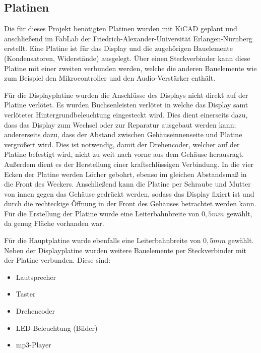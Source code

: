\documentclass[journal, a4paper]{IEEEtran}
\begin{document}
	\subsection{Platinen}
		\label{sc:Hardware:subsc:Platinen}
		Die für dieses Projekt benötigten Platinen wurden mit KiCAD geplant und anschließend im FabLab der Friedrich-Alexander-Universität Erlangen-Nürnberg erstellt. Eine Platine ist für das Display und die zugehörigen Bauelemente (Kondensatoren, Widerstände) ausgelegt. Über einen Steckverbinder kann diese Platine mit einer zweiten verbunden werden, welche die anderen Bauelemente wie zum Beispiel den Mikrocontroller und den Audio-Verstärker enthält. \par
		Für die Displayplatine wurden die Anschlüsse des Displays nicht direkt auf der Platine verlötet. Es wurden Buchsenleisten verlötet in welche das Display samt verlöteter Hintergrundbeleuchtung eingesteckt wird. Dies dient einerseits dazu, dass das Display zum Wechsel oder zur Reparatur ausgebaut werden kann; andererseits dazu, dass der Abstand zwischen Gehäuseinnenseite und Platine vergrößert wird. Dies ist notwendig, damit der Drehencoder, welcher auf der Platine befestigt wird, nicht zu weit nach vorne aus dem Gehäuse herausragt. Außerdem dient es der Herstellung einer kraftschlüssigen Verbindung. In die vier Ecken der Platine werden Löcher gebohrt, ebenso im gleichen Abstandsmaß in die Front des Weckers. Anschließend kann die Platine per Schraube und Mutter von innen gegen das Gehäuse gedrückt werden, sodass das Display fixiert ist und durch die rechteckige Öffnung in der Front des Gehäuses betrachtet werden kann. Für die Erstellung der Platine wurde eine Leiterbahnbreite von $0,5mm$ gewählt, da genug Fläche vorhanden war.\par
		Für die Hauptplatine wurde ebenfalls eine Leiterbahnbreite von $0,5mm$ gewählt. Neben der Displayplatine wurden weitere Bauelemente per Steckverbinder mit der Platine verbunden. Diese sind:
		\begin{itemize}
			\item Lautsprecher
			\item Taster
			\item Drehencoder
			\item LED-Beleuchtung (Bilder)
			\item mp3-Player
		\end{itemize}
\end{document}
